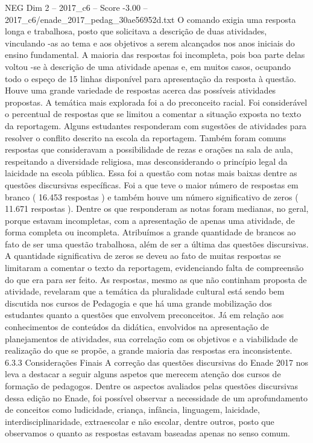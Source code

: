 \begin{textsample}{NEG Dim 2 – 2017\_c6 – Score -3.00 – 2017\_c6/enade\_2017\_pedag\_30ae56952d.txt}
O comando exigia uma resposta longa e trabalhosa, posto que solicitava a descrição de duas atividades, vinculando -as ao tema e aos objetivos a serem alcançados nos anos iniciais do ensino fundamental.
A maioria das respostas foi incompleta, pois boa parte delas voltou -se à descrição de uma atividade apenas e, em muitos casos, ocupando todo o espeço de 15 linhas disponível para apresentação da resposta à questão.
Houve uma grande variedade de respostas acerca das possíveis atividades propostas.
A temática mais explorada foi a do preconceito racial.
Foi considerável o percentual de respostas que se limitou a comentar a situação exposta no texto da reportagem.
Alguns estudantes responderam com sugestões de atividades para resolver o conflito descrito na escola da reportagem.
Também foram comuns respostas que consideravam a possibilidade de rezas e orações na sala de aula, respeitando a diversidade religiosa, mas desconsiderando o princípio legal da laicidade na escola pública.
Essa foi a questão com notas mais baixas dentre as questões discursivas específicas.
Foi a que teve o maior número de respostas em branco ( 16.453 respostas ) e também houve um número significativo de zeros ( 11.671 respostas ).
Dentre os que responderam as notas foram medianas, no geral, porque estavam incompletas, com a apresentação de apenas uma atividade, de forma completa ou incompleta.
Atribuímos a grande quantidade de brancos ao fato de ser uma questão trabalhosa, além de ser a última das questões discursivas.
A quantidade significativa de zeros se deveu ao fato de muitas respostas se limitaram a comentar o texto da reportagem, evidenciando falta de compreensão do que era para ser feito.
As respostas, mesmo as que não continham proposta de atividade, revelaram que a temática da pluralidade cultural está sendo bem discutida nos cursos de Pedagogia e que há uma grande mobilização dos estudantes quanto a questões que envolvem preconceitos.
Já em relação aos conhecimentos de conteúdos da didática, envolvidos na apresentação de planejamentos de atividades, sua correlação com os objetivos e a viabilidade de realização do que se propõe, a grande maioria das respostas era inconsistente. 6.3.3 Considerações Finais A correção das questões discursivas do Enade 2017 nos leva a destacar a seguir alguns aspetos que merecem atenção dos cursos de formação de pedagogos.
Dentre os aspectos avaliados pelas questões discursivas dessa edição no Enade, foi possível observar a necessidade de um aprofundamento de conceitos como ludicidade, criança, infância, linguagem, laicidade, interdisciplinaridade, extraescolar e não escolar, dentre outros, posto que observamos o quanto as respostas estavam baseadas apenas no senso comum.

\end{textsample}
